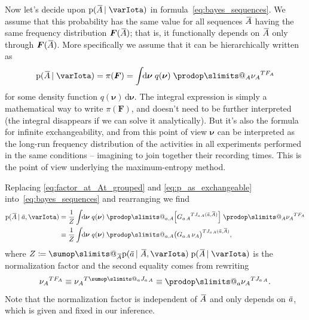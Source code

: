 \documentclass[\ifafour a4paper,12pt,\else a5paper,10pt,\fi%
onecolumn,oneside,article,%
british%
]{memoir}
\makeatletter
\theoremstyle{remark}
\theoremstyle{innote}
\def\sum{\DOTSI\sumop\slimits@}
\def\prod{\DOTSI\prodop\slimits@}
\newcommand*{\delt}{\deltaup}%
\newcommand*{\di}{\mathrm{d}}%
\newcommand*{\defd}{\coloneqq}
\newcommand*{\pf}{\mathrm{p}}%
\renewcommand*{\|}[1][]{\nonscript\,#1\vert\nonscript\;\mathopen{}}
\newcommand*{\widebar}[1]{{\mkern1.5mu\skew{2}\overline{\mkern-1.5mu#1\mkern-1.5mu}\mkern 1.5mu}}
\newcommand*{\yFF}{F}
\newcommand*{\yF}{\bm{\yFF}}
\newcommand*{\yAs}{\widebar{A}}%
\newcommand*{\yas}{\widebar{a}}%
\newcommand*{\yI}{\varIota}
\newcommand*{\yJJ}{J}
\newcommand*{\yJ}{\bm{\yJJ}}
\newcommand*{\ynuu}{\nu}
\newcommand*{\ynu}{\bm{\ynuu}}
\newcommand*{\yeq}{\mathrel{\!=\!}}
\makeatother
\begin{document}
\medskip

Now let's decide upon $\pf(\yAs \| \yI)$ in
formula~\eqref{eq:bayes_sequences}. We assume that this probability has the
same value for all sequences $\yAs$ having the same frequency distribution
$\yF(\yAs)$; that is, it functionally depends on $\yAs$ only through
$\yF(\yAs)$. More specifically we assume that it can be hierarchically
written as
\begin{equation}
  \label{eq:p_as_exchangeable}
  \pf(\yAs \| \yI) = \pi(\yF) =
  \int\!\!\di\ynu\;q(\ynu)\;\prod_{A}{\nu_{A}}^{T F_{A}}
\end{equation}
for some density function $q(\ynu)\,\di\ynu$. The integral expression is
simply a mathematical way to write $\pi(\yF)$, and doesn't need to be
further interpreted (the integral disappears if we can solve it
analytically). But it's also the formula for infinite exchangeability, and
from this point of view $\ynu$ can be interpreted as the long-run frequency
distribution of the activities in all experiments performed in the same
conditions -- imagining to join together their recording times. This is the
point of view underlying the maximum-entropy method.

\medskip

Replacing \eqref{eq:factor_at_At_grouped} and \eqref{eq:p_as_exchangeable}
into~\eqref{eq:bayes_sequences} and rearranging we find
\begin{equation}
  \label{eq:bayes_sequences_developed}
  \begin{split}
  \pf(\yAs \| \yas, \yI) &= \frac{1}{Z}
  \int\!\!\di\ynu\;q(\ynu)\; %
  \prod_{a,A} \Bigl[{G_{a\,A}}^{T J_{a\,A}(\yas,\yAs)}\Bigr]
  \;\prod_{A}{\nu_{A}}^{T F_{A}}
  \\
  &\equiv
  \frac{1}{Z}
  \int\!\!\di\ynu\;q(\ynu)\; %
  \prod_{a,A} \bigl(G_{a\,A}\,\nu_{A}\bigr)^{T J_{a\,A}(\yas,\yAs)},
\end{split}
\end{equation}
where $Z\defd \sum_{\yAs}\pf(\yas \| \yAs, \yI)\;\pf(\yAs \| \yI)$ is the
normalization factor and the second equality comes from rewriting
\begin{equation}
  \label{eq:rewrite_nu_power}
  {\nu_{A}}^{T F_{A}} \equiv {\nu_{A}}^{T \sum_{a}J_{a\,A}}
  \equiv \prod_{a}{\nu_{A}}^{T J_{a\,A}}.
\end{equation}
Note that the normalization factor is independent of $\yAs$ and only
depends on $\yas$, which is given and fixed in our inference.
\end{document}
